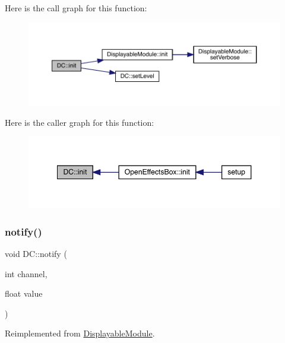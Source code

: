 Here is the call graph for this function\+:\nopagebreak
\begin{figure}[H]
\begin{center}
\leavevmode
\includegraphics[width=350pt]{class_d_c_a767b3f22587703e7f59020d44872f432_cgraph}
\end{center}
\end{figure}
Here is the caller graph for this function\+:\nopagebreak
\begin{figure}[H]
\begin{center}
\leavevmode
\includegraphics[width=348pt]{class_d_c_a767b3f22587703e7f59020d44872f432_icgraph}
\end{center}
\end{figure}
\mbox{\label{class_d_c_a45e51132fbd69668134f3ab13f3668b1}} 
\subsubsection{\texorpdfstring{notify()}{notify()}}
{\footnotesize\ttfamily void D\+C\+::notify (\begin{DoxyParamCaption}\item[{int}]{channel,  }\item[{float}]{value }\end{DoxyParamCaption})\hspace{0.3cm}{\ttfamily [virtual]}}



Reimplemented from \mbox{\hyperlink{class_displayable_module_a8ae5383931f10c54cff2feef2bc07dee}{Displayable\+Module}}.

